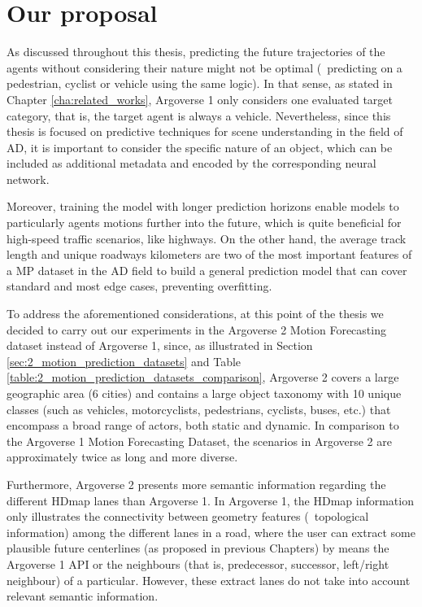 \section{Our proposal}
\label{sec:7_our_proposal}

As discussed throughout this thesis, predicting the future trajectories of the agents without considering their nature might not be optimal (\eg \ predicting on a pedestrian, cyclist or vehicle using the same logic). In that sense, as stated in Chapter \ref{cha:related_works}, Argoverse 1 only considers one evaluated target category, that is, the target agent is always a vehicle. Nevertheless, since this thesis is focused on predictive techniques for scene understanding in the field of \ac{AD}, it is important to consider the specific nature of an object, which can be included as additional metadata and encoded by the corresponding neural network. 

Moreover, training the model with longer prediction horizons enable models to particularly agents motions further into the future, which is quite beneficial for high-speed traffic scenarios, like highways. On the other hand, the average track length and unique roadways kilometers are two of the most important features of a \ac{MP} dataset in the \ac{AD} field to build a general prediction model that can cover standard and most edge cases, preventing overfitting.

To address the aforementioned considerations, at this point of the thesis we decided to carry out our experiments in the Argoverse 2 Motion Forecasting dataset instead of Argoverse 1, since, as illustrated in Section \ref{sec:2_motion_prediction_datasets} and Table \ref{table:2_motion_prediction_datasets_comparison}, Argoverse 2 covers a large geographic area (6 cities) and contains a large object taxonomy with 10 unique classes (such as vehicles, motorcyclists, pedestrians, cyclists, buses, etc.) that encompass a broad range of actors, both static and dynamic. In comparison to the Argoverse 1 Motion Forecasting Dataset, the scenarios in Argoverse 2 are approximately twice as long and more diverse. 

Furthermore, Argoverse 2 presents more semantic information regarding the different \ac{HDmap} lanes than Argoverse 1. In Argoverse 1, the \ac{HDmap} information only illustrates the connectivity between geometry features (\ie \ topological information) among the different lanes in a road, where the user can extract some plausible future centerlines (as proposed in previous Chapters) by means the Argoverse 1 \ac{API} or the neighbours (that is, predecessor, successor, left/right neighbour) of a particular. However, these extract lanes do not take into account relevant semantic information. 

